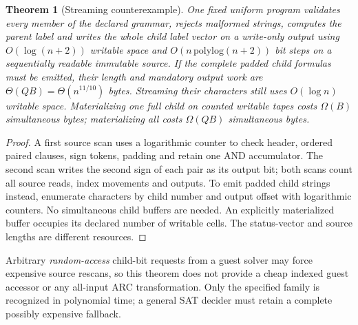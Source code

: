 \documentclass[11pt]{article}
\newtheorem{theorem}{Theorem}
\begin{document}
\begin{theorem}[Streaming counterexample]
One fixed uniform program validates every member of the declared grammar, rejects malformed strings, computes the parent label and writes the whole child label vector on a write-only output using $O(\log(n+2))$ writable space and $O(n\,\mathrm{polylog}(n+2))$ bit steps on a sequentially readable immutable source. If the complete \emph{padded child formulas} must be emitted, their length and mandatory output work are $\Theta(QB)=\Theta(n^{11/10})$ bytes. Streaming their characters still uses $O(\log n)$ writable space. Materializing one full child on counted writable tapes costs $\Omega(B)$ simultaneous bytes; materializing all costs $\Omega(QB)$ simultaneous bytes.
\end{theorem}
\begin{proof}
A first source scan uses a logarithmic counter to check header, ordered paired clauses, sign tokens, padding and retain one AND accumulator. The second scan writes the second sign of each pair as its output bit; both scans count all source reads, index movements and outputs. To emit padded child strings instead, enumerate characters by child number and output offset with logarithmic counters. No simultaneous child buffers are needed. An explicitly materialized buffer occupies its declared number of writable cells. The status-vector and source lengths are different resources.
\end{proof}
\noindent Arbitrary \emph{random-access} child-bit requests from a guest solver may force expensive source rescans, so this theorem does not provide a cheap indexed guest accessor or any all-input ARC transformation. Only the specified family is recognized in polynomial time; a general SAT decider must retain a complete possibly expensive fallback.
\end{document}
